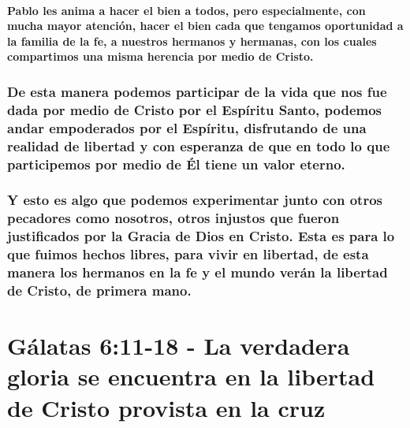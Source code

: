 \documentclass[11a pt,twoside]{article}
\let\oldsection\section
\renewcommand{\section}{\needspace{6\baselineskip}\oldsection}
\let\oldsubsubsection\subsubsection
\renewcommand{\subsubsection}{\needspace{4\baselineskip}\oldsubsubsection}
\let\oldparagraph\paragraph
\renewcommand{\paragraph}{\needspace{3\baselineskip}\oldparagraph}
\begin{document}
\paragraph{Pablo les anima a hacer el bien a todos, pero especialmente,
con mucha mayor atención, hacer el bien cada que tengamos oportunidad a
la familia de la fe, a nuestros hermanos y hermanas, con los cuales
compartimos una misma herencia por medio de
Cristo.}\label{pablo-les-anima-a-hacer-el-bien-a-todos-pero-especialmente-con-mucha-mayor-atenciuxf3n-hacer-el-bien-cada-que-tengamos-oportunidad-a-la-familia-de-la-fe-a-nuestros-hermanos-y-hermanas-con-los-cuales-compartimos-una-misma-herencia-por-medio-de-cristo.}

\subsubsection{De esta manera podemos participar de la vida que nos fue
dada por medio de Cristo por el Espíritu Santo, podemos andar
empoderados por el Espíritu, disfrutando de una realidad de libertad y
con esperanza de que en todo lo que participemos por medio de Él tiene
un valor
eterno.}\label{de-esta-manera-podemos-participar-de-la-vida-que-nos-fue-dada-por-medio-de-cristo-por-el-espuxedritu-santo-podemos-andar-empoderados-por-el-espuxedritu-disfrutando-de-una-realidad-de-libertad-y-con-esperanza-de-que-en-todo-lo-que-participemos-por-medio-de-uxe9l-tiene-un-valor-eterno.}

\subsubsection{Y esto es algo que podemos experimentar junto con otros
pecadores como nosotros, otros injustos que fueron justificados por la
Gracia de Dios en Cristo. Esta es para lo que fuimos hechos libres, para
vivir en libertad, de esta manera los hermanos en la fe y el mundo verán
la libertad de Cristo, de primera
mano.}\label{y-esto-es-algo-que-podemos-experimentar-junto-con-otros-pecadores-como-nosotros-otros-injustos-que-fueron-justificados-por-la-gracia-de-dios-en-cristo.-esta-es-para-lo-que-fuimos-hechos-libres-para-vivir-en-libertad-de-esta-manera-los-hermanos-en-la-fe-y-el-mundo-veruxe1n-la-libertad-de-cristo-de-primera-mano.}

\section{Gálatas 6:11-18 - La verdadera gloria se encuentra en la
libertad de Cristo provista en la
cruz}\label{guxe1latas-611-18---la-verdadera-gloria-se-encuentra-en-la-libertad-de-cristo-provista-en-la-cruz}
\end{document}
